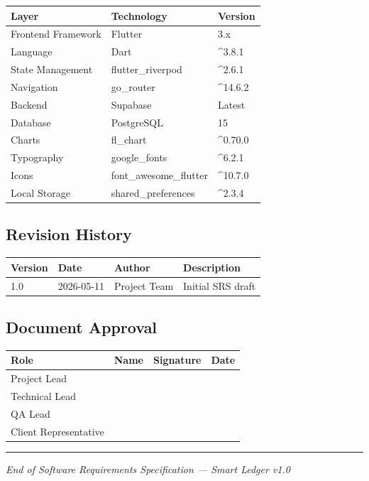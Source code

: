 \documentclass[journal, a4paper, onecolumn, 12pt]{IEEEtran}
\begin{document}
\begin{longtable}{|p{}|p{}|p{}|}
\hline
Layer & Technology & Version \\ \hline
\hline
Frontend Framework & Flutter & 3.x \\ \hline
Language & Dart & ^3.8.1 \\ \hline
State Management & flutter\_riverpod & ^2.6.1 \\ \hline
Navigation & go\_router & ^14.6.2 \\ \hline
Backend & Supabase & Latest \\ \hline
Database & PostgreSQL & 15 \\ \hline
Charts & fl\_chart & ^0.70.0 \\ \hline
Typography & google\_fonts & ^6.2.1 \\ \hline
Icons & font\_awesome\_flutter & ^10.7.0 \\ \hline
Local Storage & shared\_preferences & ^2.3.4 \\ \hline
\end{longtable}
\subsection{Revision History}

\begin{longtable}{|p{}|p{}|p{}|p{}|}
\hline
Version & Date & Author & Description \\ \hline
\hline
1.0 & 2026-05-11 & Project Team & Initial SRS draft \\ \hline
\end{longtable}
\subsection{Document Approval}

\begin{longtable}{|p{}|p{}|p{}|p{}|}
\hline
Role & Name & Signature & Date \\ \hline
\hline
Project Lead &  &  &  \\ \hline
Technical Lead &  &  &  \\ \hline
QA Lead &  &  &  \\ \hline
Client Representative &  &  &  \\ \hline
\end{longtable}
\vspace{1em}\hrule\vspace{1em}

\textit{End of Software Requirements Specification — Smart Ledger v1.0}
\end{document}

